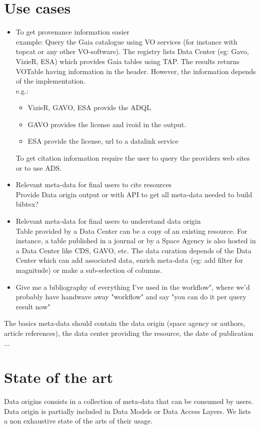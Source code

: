 \documentclass[11pt,a4paper]{ivoa}
\begin{document}
\section{Use cases}
\begin{itemize}
	\item To get provenance information easier \\
	example: Query the Gaia catalogue using VO services (for instance with topcat or any other VO-software). The registry lists Data Center (eg: Gavo, VizieR, ESA) which provides Gaia  tables using TAP. The results returns VOTable having information in the header. However, the information depends of the implementation.\\
	e.g.:\\
	\begin{itemize}
		\item VizieR, GAVO, ESA provide the ADQL 
		\item GAVO provides the license and ivoid in the output.
		\item ESA provide the license, url to a datalink service
	\end{itemize} 
	To get citation information require the user to query the providers web sites or to use ADS.
	\item Relevant meta-data for final users to cite resources \\
	Provide Data origin output or with API to get all meta-data needed to build bibtex?
	\item Relevant meta-data for final users to understand data origin \\
	Table provided by a Data Center can be a copy of an existing resource. For instance, a table published in a journal or by a Space Agency is also hosted in a Data Center like CDS, GAVO, etc.
	The data curation depends of the Data Center which can add associated data, enrich meta-data (eg: add filter for magnitude) or make a sub-selection of columns.
	\item Give me a bibliography of everything I've used in the workflow", where we'd probably have handwave away "workflow" and say "you can do it per query result  now"
\end{itemize}

The basics meta-data should contain the data origin (space agency or authors, article references), the data center providing the resource, the date of publication ...

\section{State of the art}
Data origins consists in a collection of meta-data that can be consumed by users. Data origin is partially included in Data Models or Data Access Layers. We lists a non exhaustive state of the arts of their usage.
\end{document}
